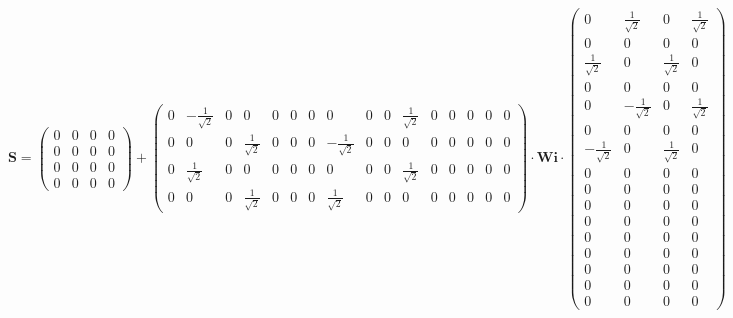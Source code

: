\[ \mathbf{S} = \left(\begin{smallmatrix} 0 & 0 & 0 & 0 \\ 0 & 0 & 0 &
0 \\ 0 & 0 & 0 & 0 \\ 0 & 0 & 0 & 0 \end{smallmatrix}\right) +
\left(\begin{smallmatrix} 0 & -\frac{1}{\sqrt{2}} & 0 & 0 & 0 & 0 & 0
& 0 & 0 & 0 & \frac{1}{\sqrt{2}} & 0 & 0 & 0 & 0 & 0 \\ 0 & 0 & 0 &
\frac{1}{\sqrt{2}} & 0 & 0 & 0 & -\frac{1}{\sqrt{2}} & 0 & 0 & 0 & 0 &
0 & 0 & 0 & 0 \\ 0 & \frac{1}{\sqrt{2}} & 0 & 0 & 0 & 0 & 0 & 0 & 0 &
0 & \frac{1}{\sqrt{2}} & 0 & 0 & 0 & 0 & 0 \\ 0 & 0 & 0 &
\frac{1}{\sqrt{2}} & 0 & 0 & 0 & \frac{1}{\sqrt{2}} & 0 & 0 & 0 & 0 &
0 & 0 & 0 & 0 \end{smallmatrix}\right) \cdot \mathbf{Wi}
\cdot\left(\begin{smallmatrix} 0 & \frac{1}{\sqrt{2}} & 0 &
\frac{1}{\sqrt{2}} \\ 0 & 0 & 0 & 0 \\ \frac{1}{\sqrt{2}} & 0 &
\frac{1}{\sqrt{2}} & 0 \\ 0 & 0 & 0 & 0 \\ 0 & -\frac{1}{\sqrt{2}} & 0
& \frac{1}{\sqrt{2}} \\ 0 & 0 & 0 & 0 \\ -\frac{1}{\sqrt{2}} & 0 &
\frac{1}{\sqrt{2}} & 0 \\ 0 & 0 & 0 & 0 \\ 0 & 0 & 0 & 0 \\ 0 & 0 & 0
& 0 \\ 0 & 0 & 0 & 0 \\ 0 & 0 & 0 & 0 \\ 0 & 0 & 0 & 0 \\ 0 & 0 & 0 &
0 \\ 0 & 0 & 0 & 0 \\ 0 & 0 & 0 & 0 \end{smallmatrix}\right) \]
